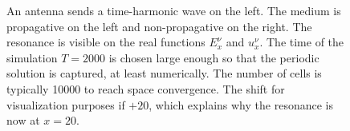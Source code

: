 \begin{figure}[h]
\begin{center}
\begin{tabular}{ccc}
			
		\end{tabular}   \end{center}
		\caption{An antenna sends a time-harmonic wave on the left. The medium is propagative
			on the left and non-propagative
			on the right. The resonance is visible on the real functions
			$E_x^\nu$ and $u_x^\nu$. The time of the simulation $T=2000$ is chosen large enough so that the
			periodic solution is captured, at least numerically. The number of cells
			is typically 10000 to reach space  convergence. The shift for visualization purposes if $+20$, which explains
			why the resonance is now at $x=20$.}
		\label{fig:vasl}
	\end{figure}





